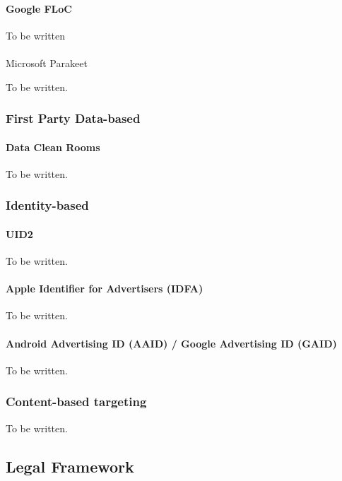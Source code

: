 \paragraph{Google FLoC}

To be written

\paragraph{}{Microsoft Parakeet}

To be written.

\subsubsection{First Party Data-based}

\paragraph{Data Clean Rooms}

To be written.

\subsubsection{Identity-based}

\paragraph{UID2}

To be written.

\paragraph{Apple Identifier for Advertisers (IDFA)}

To be written.

\paragraph{Android Advertising ID (AAID) / Google Advertising ID (GAID)}

To be written.

\subsubsection{Content-based targeting}

To be written.

\subsection{Legal Framework}

